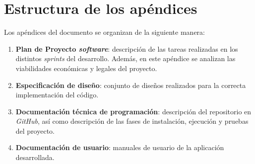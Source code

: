 \section{Estructura de los apéndices}
Los apéndices del documento se organizan de la siguiente manera:
\begin{enumerate}
	\item \textbf{Plan de Proyecto \textit{software}}: descripción de las tareas realizadas en los distintos \textit{sprints} del desarrollo. Además, en este apéndice se analizan las viabilidades económicas y legales del proyecto.
	\item \textbf{Especificación de diseño}: conjunto de diseños realizados para la correcta implementación del código.
	\item \textbf{Documentación técnica de programación}: descripción del repositorio en \textit{GitHub}, así como descripción de las fases de instalación, ejecución y pruebas del proyecto.
	\item \textbf{Documentación de usuario}: manuales de usuario de la aplicación desarrollada.
\end{enumerate}

